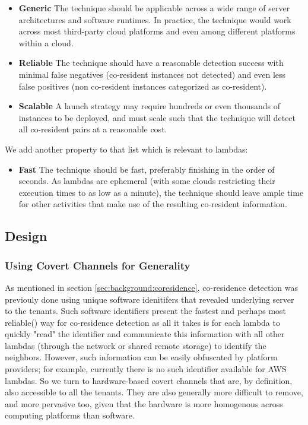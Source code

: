 \begin{itemize}
    \item \textbf{Generic} The technique should be applicable across a wide
    range of server architectures and software runtimes. In practice, the
    technique would work across most third-party cloud platforms and even 
    among different platforms within a cloud.
    \item \textbf{Reliable} The technique should have a reasonable detection success
    with minimal false negatives (co-resident instances not detected) and even 
    less false positives (non co-resident instances categorized as co-resident).
    \item \textbf{Scalable} A launch strategy may require hundreds or even
    thousands of instances to be deployed, and must scale such that the
    technique will detect all co-resident pairs at a reasonable cost.
\end{itemize}

\noindent We add another property to that list which is relevant to lambdas:
\begin{itemize}
    \item \textbf{Fast} The technique should be fast, preferably finishing in 
    the order of seconds. As lambdas are ephemeral (with some clouds restricting their 
    execution times to as low as a minute), the technique should leave ample time 
    for other activities that make use of the resulting co-resident information.
\end{itemize}


\subsection{Design}

\subsubsection{Using Covert Channels for Generality}
As mentioned in section \ref{sec:background:coresidence}, co-residence detection 
was previouly done using unique software idenitifers that revealed underlying server 
to the tenants. Such software identifiers present the fastest and perhaps most 
reliable() way for co-residence detection 
as all it takes is for each lambda to quickly
"read" the identifier and communicate this information with all other lambdas 
(through the network or shared remote storage) to identify the 
neighbors. However, such information can be easily obfuscated by platform providers;
for example, currently there is no such identifier available for AWS lambdas. 
So we turn to hardware-based covert channels that are, by definition, also accessible to all the 
tenants. They are also generally more difficult to remove, and more pervasive too, 
given that the hardware is more homogenous across computing platforms than software. 


